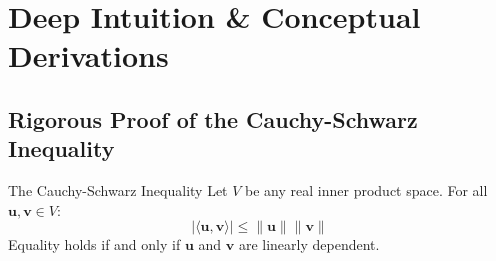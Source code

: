 \section{Deep Intuition \& Conceptual Derivations}

\subsection{Rigorous Proof of the Cauchy-Schwarz Inequality}

\begin{theorembox}{The Cauchy-Schwarz Inequality}
Let $V$ be any real inner product space. For all $\mathbf{u}, \mathbf{v} \in V$:
\begin{equation}
|\langle \mathbf{u}, \mathbf{v} \rangle| \le \|\mathbf{u}\| \|\mathbf{v}\|
\end{equation}
Equality holds if and only if $\mathbf{u}$ and $\mathbf{v}$ are linearly dependent.
\end{theorembox}


